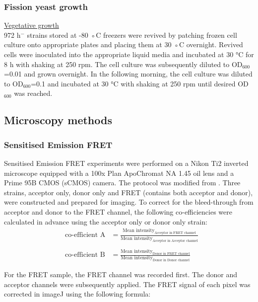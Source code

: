 \subsubsection{Fission yeast growth}

\underline{Vegetative growth}\\
972 h$^{-}$ strains stored at -80 ◦C freezers were revived by patching frozen cell culture onto appropriate plates and placing them at 30 ◦C overnight. Revived cells were inoculated into the appropriate liquid media and incubated at 30 \si{\celsius} for 8 \si{\hour} with shaking at 250 rpm. The cell culture was subsequently diluted to OD$_{600}$=0.01 and grown overnight. In the following morning, the cell culture was diluted to OD$_{600}$=0.1 and incubated at 30 \si{\celsius} with shaking at 250 rpm until desired OD$_{600}$ was reached. 

\subsection{Microscopy methods}
\subsubsection{Sensitised Emission FRET}
Sensitised Emission FRET experiments were performed on a Nikon Ti2 inverted microscope equipped with a 100x Plan ApoChromat NA 1.45 oil lens and a Prime 95B CMOS (sCMOS) camera. The protocol was modified from \cite{Gordon1998QuantitativeMicroscopy}. Three strains, acceptor only, donor only and FRET (contains both acceptor and donor), were constructed and prepared for imaging. To correct for the bleed-through from acceptor and donor to the FRET channel, the following co-efficiencies were calculated in advance using the acceptor only or donor only strain:
\begin{align*}
    & \text{co-efficient A}& =\frac{\text{Mean intensity}_\text{Acceptor in FRET channel}}{\text{Mean intensity}_\text{Acceptor in Acceptor channel}}\\
    &\\
    & \text{co-efficient B}& =\frac{\text{Mean intensity}_\text{Donor in FRET channel}}{\text{Mean intensity}_\text{Donor in Donor channel}}
\end{align*}

For the FRET sample, the FRET channel was recorded first. The donor and acceptor channels were subsequently applied. The FRET signal of each pixel was corrected in imageJ using the following formula: 

